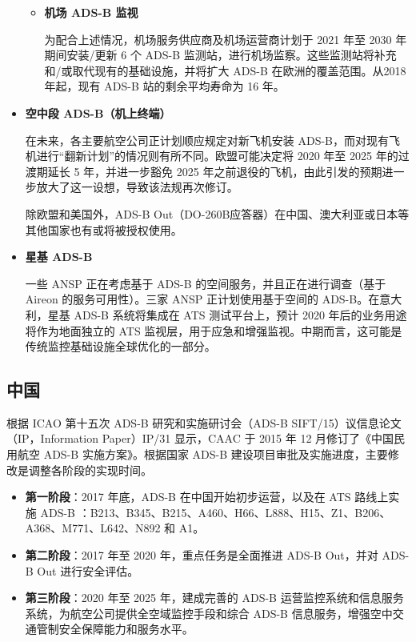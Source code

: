 \begin{itemize}
\begin{itemize}
        \item \textbf{机场 ADS-B 监视}

        为配合上述情况，机场服务供应商及机场运营商计划于 2021 年至 2030 年期间安装/更新 6 个 ADS-B 监测站，进行机场监察。这些监测站将补充和/或取代现有的基础设施，并将扩大 ADS-B 在欧洲的覆盖范围。从2018年起，现有 ADS-B 站的剩余平均寿命为 16 年。
    \end{itemize}

    \item \textbf{空中段 ADS-B（机上终端）}

    在未来，各主要航空公司正计划顺应规定对新飞机安装 ADS-B，而对现有飞机进行“翻新计划”的情况则有所不同。欧盟可能决定将 2020 年至 2025 年的过渡期延长 5 年，并进一步豁免 2025 年之前退役的飞机，由此引发的预期进一步放大了这一设想，导致该法规再次修订。

    除欧盟和美国外，ADS-B Out（DO-260B应答器）在中国、澳大利亚或日本等其他国家也有或将被授权使用。

    \item \textbf{星基 ADS-B}

    一些 ANSP 正在考虑基于 ADS-B 的空间服务，并且正在进行调查（基于 Aireon 的服务可用性）。三家 ANSP 正计划使用基于空间的 ADS-B。在意大利，星基 ADS-B 系统将集成在 \acs{ATS} 测试平台上，预计 2020 年后的业务用途将作为地面独立的 ATS 监视层，用于应急和增强监视。中期而言，这可能是传统监控基础设施全球优化的一部分。

\end{itemize}

\subsection{中国}

根据 ICAO 第十五次 ADS-B 研究和实施研讨会（ADS-B SIFT/15）议信息论文（IP，Information Paper）IP/31 显示，\acs{CAAC} 于 2015 年 12 月修订了《中国民用航空 ADS-B 实施方案》。根据国家 ADS-B 建设项目审批及实施进度，主要修改是调整各阶段的实现时间。

\begin{itemize}
    \item \textbf{第一阶段}：2017 年底，ADS-B 在中国开始初步运营，以及在 ATS 路线上实施 ADS-B ：B213、B345、B215、A460、H66、L888、H15、Z1、B206、A368、M771、L642、N892 和 A1。

    \item \textbf{第二阶段}：2017 年至 2020 年，重点任务是全面推进 ADS-B Out，并对 ADS-B Out 进行安全评估。

    \item \textbf{第三阶段}：2020 年至 2025 年，建成完善的 ADS-B 运营监控系统和信息服务系统，为航空公司提供全空域监控手段和综合 ADS-B 信息服务，增强空中交通管制安全保障能力和服务水平。
\end{itemize}

